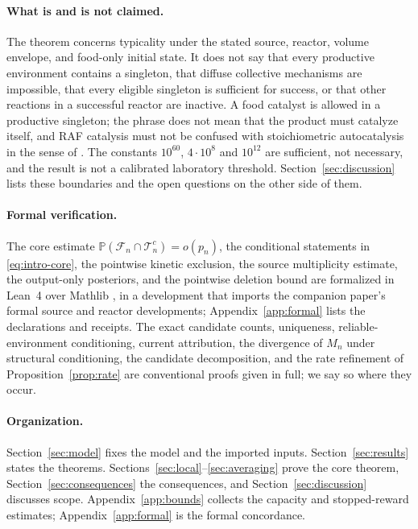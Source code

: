 \documentclass[11pt,letterpaper]{article}
\theoremstyle{plain}
\theoremstyle{definition}
\theoremstyle{remark}
\numberwithin{equation}{section}
\newcommand{\PP}{\mathbb P}
\newcommand{\cF}{\mathcal F}
\newcommand{\cT}{\mathcal T}
\begin{document}
\paragraph{What is and is not claimed.}
The theorem concerns typicality under the stated source, reactor, volume envelope, and food-only initial state. It does not say that every productive environment contains a singleton, that diffuse collective mechanisms are impossible, that every eligible singleton is sufficient for success, or that other reactions in a successful reactor are inactive. A food catalyst is allowed in a productive singleton; the phrase does not mean that the product must catalyze itself, and RAF catalysis must not be confused with stoichiometric autocatalysis in the sense of \cite{blokhuis2020universal}. The constants $10^{60}$, $4\cdot10^8$ and $10^{12}$ are sufficient, not necessary, and the result is not a calibrated laboratory threshold. Section~\ref{sec:discussion} lists these boundaries and the open questions on the other side of them.

\paragraph{Formal verification.}
The core estimate $\PP(\cF_n\cap\cT_n^c)=o(p_n)$, the conditional statements in \eqref{eq:intro-core}, the pointwise kinetic exclusion, the source multiplicity estimate, the output-only posteriors, and the pointwise deletion bound are formalized in Lean~4 \cite{demoura2021lean4} over Mathlib \cite{mathlib2020}, in a development that imports the companion paper's formal source and reactor developments; Appendix~\ref{app:formal} lists the declarations and receipts. The exact candidate counts, uniqueness, reliable-environment conditioning, current attribution, the divergence of $M_n$ under structural conditioning, the candidate decomposition, and the rate refinement of Proposition~\ref{prop:rate} are conventional proofs given in full; we say so where they occur.

\paragraph{Organization.}
Section~\ref{sec:model} fixes the model and the imported inputs. Section~\ref{sec:results} states the theorems. Sections~\ref{sec:local}--\ref{sec:averaging} prove the core theorem, Section~\ref{sec:consequences} the consequences, and Section~\ref{sec:discussion} discusses scope. Appendix~\ref{app:bounds} collects the capacity and stopped-reward estimates; Appendix~\ref{app:formal} is the formal concordance.
\end{document}
